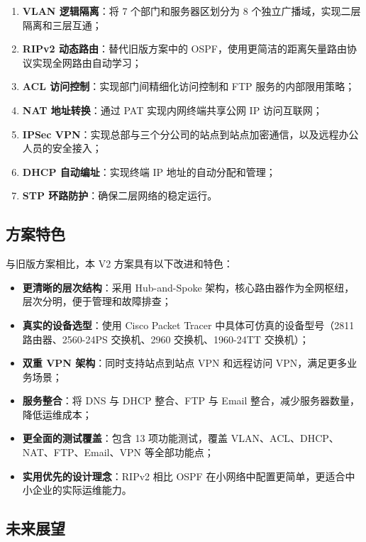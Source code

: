 \documentclass[12pt,a4paper]{ctexart}
\begin{document}
\begin{enumerate}[label=(\arabic*), leftmargin=2em]
    \item \textbf{VLAN 逻辑隔离}：将 7 个部门和服务器区划分为 8 个独立广播域，实现二层隔离和三层互通；
    \item \textbf{RIPv2 动态路由}：替代旧版方案中的 OSPF，使用更简洁的距离矢量路由协议实现全网路由自动学习；
    \item \textbf{ACL 访问控制}：实现部门间精细化访问控制和 FTP 服务的内部限用策略；
    \item \textbf{NAT 地址转换}：通过 PAT 实现内网终端共享公网 IP 访问互联网；
    \item \textbf{IPSec VPN}：实现总部与三个分公司的站点到站点加密通信，以及远程办公人员的安全接入；
    \item \textbf{DHCP 自动编址}：实现终端 IP 地址的自动分配和管理；
    \item \textbf{STP 环路防护}：确保二层网络的稳定运行。
\end{enumerate}

\subsection{方案特色}

与旧版方案相比，本 V2 方案具有以下改进和特色：

\begin{itemize}
    \item \textbf{更清晰的层次结构}：采用 Hub-and-Spoke 架构，核心路由器作为全网枢纽，层次分明，便于管理和故障排查；
    \item \textbf{真实的设备选型}：使用 Cisco Packet Tracer 中具体可仿真的设备型号（2811 路由器、2560-24PS 交换机、2960 交换机、1960-24TT 交换机）；
    \item \textbf{双重 VPN 架构}：同时支持站点到站点 VPN 和远程访问 VPN，满足更多业务场景；
    \item \textbf{服务整合}：将 DNS 与 DHCP 整合、FTP 与 Email 整合，减少服务器数量，降低运维成本；
    \item \textbf{更全面的测试覆盖}：包含 13 项功能测试，覆盖 VLAN、ACL、DHCP、NAT、FTP、Email、VPN 等全部功能点；
    \item \textbf{实用优先的设计理念}：RIPv2 相比 OSPF 在小网络中配置更简单，更适合中小企业的实际运维能力。
\end{itemize}

\subsection{未来展望}
\end{document}
